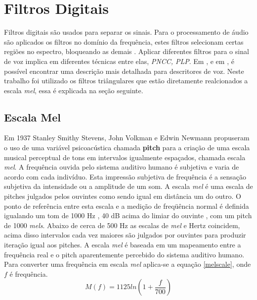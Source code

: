 \section{Filtros Digitais}
\label{sec:filt:tri}
\quad Filtros digitais são usados para separar os sinais.  Para o processamento de áudio são aplicados os filtros no domínio da frequência, estes filtros selecionam certas regiões  no espectro, bloqueando as demais \cite{sig}. Aplicar diferentes filtros para o sinal de voz implica em diferentes técnicas entre elas, \textit{PNCC, PLP}. Em \cite{mello}, e em \cite{pucpncc}, é possível encontrar uma descrição mais detalhada para descritores de voz. Neste trabalho foi utilizado os filtros triângulares que estão diretamente realcionados a escala \textit{mel}, essa é explicada na seção seguinte. 

\subsection{Escala Mel}
\label{sec:mel}
\quad Em 1937 Stanley Smithy Stevens, John Volkman e Edwin Newmann propuseram o uso de uma variável psicoacústica chamada  \textbf {pitch}  para a criação de uma escala musical perceptual de tons em intervalos igualmente espaçados, chamada escala  \textit {mel}. A frequência ouvida pelo sistema auditivo humano é subjetiva e varia de acordo com cada indivíduo. Esta impressão subjetiva de frequência é a sensação subjetiva da intensidade ou a amplitude de um som. A escala \textit{mel} é uma escala de pitches julgados pelos ouvintes como sendo igual em distância um do outro. O ponto de referência entre esta escala e a medição de freqüência normal é definida  igualando um tom de 1000 Hz , 40 dB acima do limiar do ouvinte , com um pitch de 1000 \textit{mels}. Abaixo de cerca de 500 Hz as escalas de \textit{mel} e Hertz coincidem, acima disso intervalos cada vez maiores são julgados por ouvintes para produzir iteração igual aos pitches. A escala \textit{mel} é baseada em um mapeamento entre a frequência real e o pitch aparentemente percebido do sistema auditivo humano. Para converter uma frequência em escala \textit{mel} aplica-se a equação \ref{melscale}, onde $f$ é frequência.
\begin{equation}
\label{melscale}
M(f) = 1125 ln(1 + \frac{f}{700})
\end{equation}

